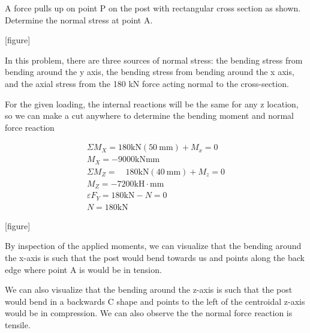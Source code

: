 \documentclass[
  letterpaper,
  DIV=11,
  numbers=noendperiod]{scrreprt}
\begin{document}
\begin{tcolorbox}[enhanced jigsaw, breakable, opacityback=0, toptitle=1mm, left=2mm, colback=white, opacitybacktitle=0.6, colframe=quarto-callout-note-color-frame, titlerule=0mm, arc=.35mm, leftrule=.75mm, bottomtitle=1mm, colbacktitle=quarto-callout-note-color!10!white, rightrule=.15mm, title={Example 14.3:}, bottomrule=.15mm, toprule=.15mm, coltitle=black]

A force pulls up on point P on the post with rectangular cross section
as shown. Determine the normal stress at point A.

{[}figure{]}

\begin{tcolorbox}[enhanced jigsaw, breakable, opacityback=0, toptitle=1mm, left=2mm, colback=white, opacitybacktitle=0.6, colframe=quarto-callout-note-color-frame, titlerule=0mm, arc=.35mm, leftrule=.75mm, bottomtitle=1mm, colbacktitle=quarto-callout-note-color!10!white, rightrule=.15mm, title={Solution}, bottomrule=.15mm, toprule=.15mm, coltitle=black]

In this problem, there are three sources of normal stress: the bending
stress from bending around the y axis, the bending stress from bending
around the x axis, and the axial stress from the 180 kN force acting
normal to the cross-section.

For the given loading, the internal reactions will be the same for any z
location, so we can make a cut anywhere to determine the bending moment
and normal force reaction

\[
\begin{aligned}
\Sigma M_X=180 \mathrm{kN}(50 \mathrm{~mm})+M_x=0 \\
M_X=-9000 \mathrm{kN} \mathrm{mm} \\
\Sigma M_Z=\quad 180 \mathrm{kN}(40 \mathrm{~mm})+M_z=0 \\
M_Z=-7200 \mathrm{kH} \cdot \mathrm{mm} \\
\varepsilon F_Y=180 \mathrm{kN}-N=0 \\
N=180 \mathrm{kN}
\end{aligned}
\]

{[}figure{]}

By inspection of the applied moments, we can visualize that the bending
around the x-axis is such that the post would bend towards us and points
along the back edge where point A is would be in tension.

We can also visualize that the bending around the z-axis is such that
the post would bend in a backwards C shape and points to the left of the
centroidal z-axis would be in compression. We can also observe the the
normal force reaction is tensile.


\end{tcolorbox}
\end{tcolorbox}
\end{document}
